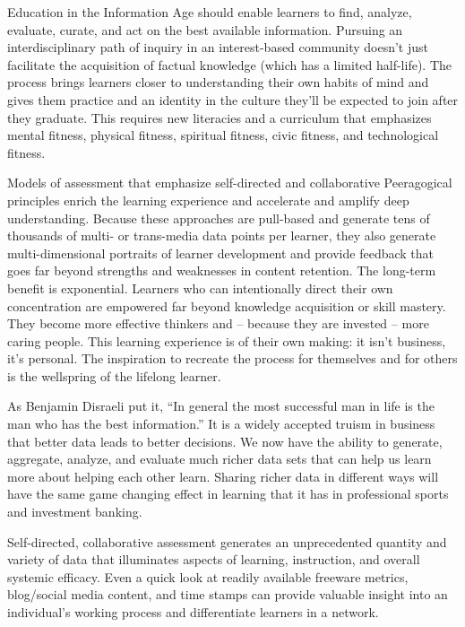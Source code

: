 Education in the Information Age should enable learners to find,
analyze, evaluate, curate, and act on the best available information.
Pursuing an interdisciplinary path of inquiry in an interest-based
community doesn't just facilitate the acquisition of factual knowledge
(which has a limited half-life). The process brings learners closer to
understanding their own habits of mind and gives them practice and an
identity in the culture they'll be expected to join after they graduate.
This requires new literacies and a curriculum that emphasizes mental
fitness, physical fitness, spiritual fitness, civic fitness, and
technological fitness.

Models of assessment that emphasize self-directed and collaborative
Peeragogical principles enrich the learning experience and accelerate
and amplify deep understanding. Because these approaches are pull-based
and generate tens of thousands of multi- or trans-media data points per
learner, they also generate multi-dimensional portraits of learner
development and provide feedback that goes far beyond strengths and
weaknesses in content retention. The long-term benefit is exponential.
Learners who can intentionally direct their own concentration are
empowered far beyond knowledge acquisition or skill mastery. They become
more effective thinkers and -- because they are invested -- more caring
people. This learning experience is of their own making: it isn't
business, it's personal. The inspiration to recreate the process for
themselves and for others is the wellspring of the lifelong learner.

As Benjamin Disraeli put it, ``In general the most successful man in
life is the man who has the best information.'' It is a widely accepted
truism in business that better data leads to better decisions. We now
have the ability to generate, aggregate, analyze, and evaluate much
richer data sets that can help us learn more about helping each other
learn. Sharing richer data in different ways will have the same game
changing effect in learning that it has in professional sports and
investment banking.

Self-directed, collaborative assessment generates an unprecedented
quantity and variety of data that illuminates aspects of learning,
instruction, and overall systemic efficacy. Even a quick look at readily
available freeware metrics, blog/social media content, and time stamps
can provide valuable insight into an individual's working process and
differentiate learners in a network.

